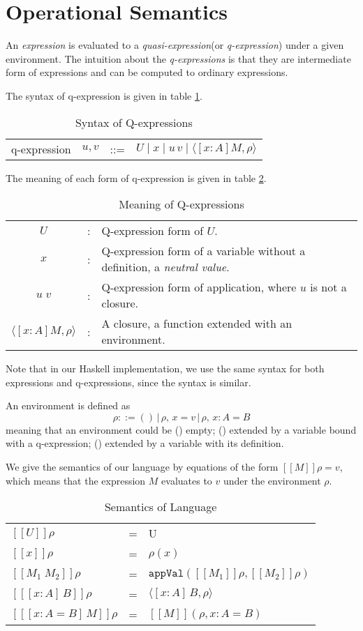 \section{Operational Semantics}
An \emph{expression} is evaluated to a \emph{quasi-expression}(or \emph{q-expression}) under a given environment. The intuition about the \emph{q-expressions} is that they are intermediate form of expressions and can be computed to ordinary expressions.

The syntax of q-expression is given in table \ref{tab:q-exp1}.
\begin{table}[h]
  \centering
  \begin{tabular}{l l l l}
    q-expression & $u, v$ & ::= & $U \mid x \mid u\, v \mid \langle [x : A] M, \rho \rangle $
  \end{tabular}
  \caption{Syntax of Q-expressions}
  \label{tab:q-exp1}
\end{table}

The meaning of each form of q-expression is given in table \ref{tab:q-exp2}.
\begin{table}[h]
  \centering
  \begin{tabular}{c l p{8cm}}
    $U$ & : & Q-expression form of $U$.\\
    $x$ & : & Q-expression form of a variable without a definition, a \emph{neutral value}.\\
    $u \; v$ & : &  Q-expression form of application, where $u$ is not a closure.\\
    $\langle [x : A] M, \rho \rangle$ & : & A closure, a function extended with an environment.\\ 
  \end{tabular}
  \caption{Meaning of Q-expressions}
  \label{tab:q-exp2}
\end{table}

Note that in our Haskell implementation, we use the same syntax for both expressions and q-expressions, since the syntax is similar.

An environment is defined as
\[
\rho ::= ()\,|\,\rho,\,x = v\,|\,\rho,\,x : A = B
\]
meaning that an environment could be () empty; () extended by a variable bound with a q-expression; () extended by a variable with its definition.

We give the semantics of our language by equations of the form $[\![M]\!]\rho = v$, which means that the expression $M$ evaluates to $v$ under the environment $\rho$.
\begin{table}[h]
  \centering
  \begin{tabular}{l l l}
    $[\![U]\!]\rho$ & = & U \\
    $[\![x]\!]\rho$ & = & $\rho(x)$ \\
    $[\![M_1 \; M_2]\!]\rho$ & = & $\texttt{appVal}([\![M_1]\!]\rho, [\![M_2]\!]\rho)$ \\
    $[\![[x : A]\,B]\!]\rho$ & = & $\langle[x : A]\,B, \rho\rangle$ \\
    $[\![[x : A = B]\,M]\!]\rho$ & = & $[\![M]\!](\rho, x : A = B)$ 
  \end{tabular}
  \caption{Semantics of Language}
\end{table}

